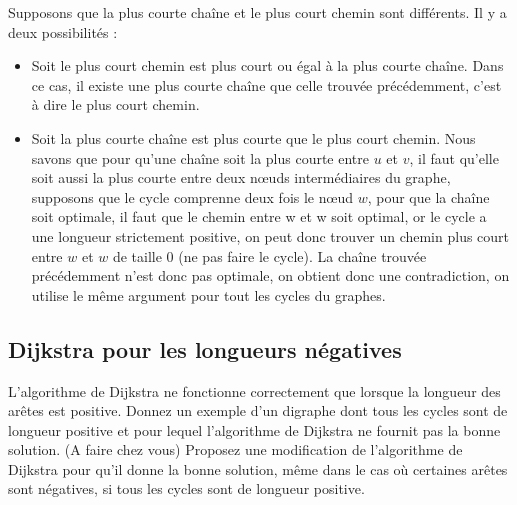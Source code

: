 \begin{solution}
  Supposons que la plus courte chaîne et le plus court chemin sont différents. Il y a deux possibilités :
  \begin{itemize}
    \item Soit le plus court chemin est plus court ou égal à la plus courte chaîne. Dans ce cas, il existe une plus courte chaîne que celle trouvée précédemment, c'est à dire le plus court chemin.
    \item Soit la plus courte chaîne est plus courte que le plus court chemin.
      Nous savons que pour qu'une chaîne soit la plus courte entre $u$ et $v$,
      il faut qu'elle soit aussi la plus courte entre deux nœuds intermédiaires du graphe,
      supposons que le cycle comprenne deux fois le nœud $w$,
      pour que la chaîne soit optimale, il faut que le chemin entre w et w soit optimal,
      or le cycle a une longueur strictement positive,
      on peut donc trouver un chemin plus court entre $w$ et $w$ de taille 0 (ne pas faire le cycle).
      La chaîne trouvée précédemment n'est donc pas optimale, on obtient donc une contradiction,
      on utilise le même argument pour tout les cycles du graphes.
  \end{itemize}
\end{solution}

\subsection{Dijkstra pour les longueurs négatives} L'algorithme de Dijkstra ne fonctionne correctement que lorsque la longueur des arêtes est positive. Donnez un exemple d'un digraphe dont tous les cycles sont de longueur positive et pour lequel l'algorithme de Dijkstra ne fournit pas la bonne solution. (A faire chez vous) Proposez une modification de l'algorithme de Dijkstra pour qu'il donne la bonne solution, même dans le cas où certaines arêtes sont négatives, si tous les cycles sont de longueur positive.

